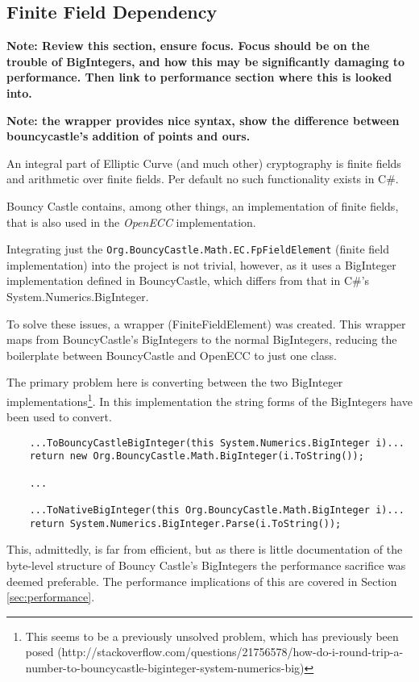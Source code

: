 \subsection{Finite Field Dependency}
\label{sec:implementation__dependencies}
\label{sec:implementation_dependency}

\textbf{Note: Review this section, ensure focus. Focus should be on the trouble of BigIntegers, and how
this may be significantly damaging to performance. Then link to performance section where this is looked into.}

\textbf{Note: the wrapper provides nice syntax, show the difference between bouncycastle's addition of points
and ours.}

An integral part of Elliptic Curve (and much other) cryptography is finite fields and arithmetic
over finite fields. Per default no such functionality exists in C\#.

Bouncy Castle contains, among other things, an implementation of finite fields, that is also used
in the \emph{OpenECC} implementation.

Integrating just the \verb+Org.BouncyCastle.Math.EC.FpFieldElement+ (finite field implementation) into
the project is not trivial, however, as it uses a BigInteger implementation defined in BouncyCastle,
which differs from that in C\#'s System.Numerics.BigInteger.

To solve these issues, a wrapper (FiniteFieldElement) was created. This wrapper maps from BouncyCastle's
BigIntegers to the normal BigIntegers, reducing the boilerplate between BouncyCastle and OpenECC to
just one class.

The primary problem here is converting between the two BigInteger implementations\footnote{This seems
to be a previously unsolved problem, which has previously been posed (http://stackoverflow.com/questions/21756578/how-do-i-round-trip-a-number-to-bouncycastle-biginteger-system-numerics-big)}.
In this implementation the string forms of the BigIntegers have been used to convert.

\begin{verbatim}
	...ToBouncyCastleBigInteger(this System.Numerics.BigInteger i)...
	return new Org.BouncyCastle.Math.BigInteger(i.ToString());
	
	...
	
	...ToNativeBigInteger(this Org.BouncyCastle.Math.BigInteger i)...
	return System.Numerics.BigInteger.Parse(i.ToString());
\end{verbatim}

This, admittedly, is far from efficient, but as there is little documentation of the byte-level structure
of Bouncy Castle's BigIntegers the performance sacrifice was deemed preferable. The performance implications
of this are covered in Section \ref{sec:performance}.